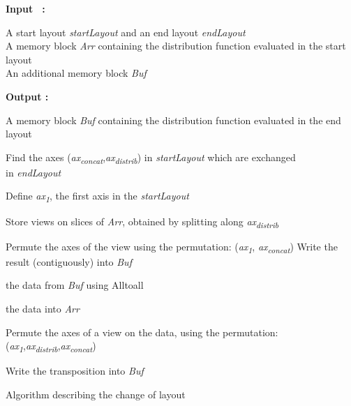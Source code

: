 \begin{algorithm}[p]
 \hspace*{\algorithmicindent} \textbf{Input \, :}
 \begin{minipage}[t]{.8\textwidth}
  A start layout {\em startLayout} and an end layout {\em endLayout} \\
  A memory block {\em Arr} containing the distribution function evaluated in the start layout \\
  An additional memory block {\em Buf} \\
 \end{minipage}
 
 \hspace*{\algorithmicindent} \textbf{Output :}
 \begin{minipage}[t]{.8\textwidth}
  A memory block {\em Buf} containing the distribution function evaluated in the end layout \\
 \end{minipage}

 \begin{algorithmic}[1]
  \STATE Find the axes ({\em ax\textsubscript{concat}},{\em ax\textsubscript{distrib}}) in {\em startLayout} which are exchanged\\ in {\em endLayout}
  
  \STATE Define {\em ax\textsubscript{1}}, the first axis in the {\em startLayout}
  
  \STATE Store views on slices of {\em Arr}, obtained by splitting along {\em ax\textsubscript{distrib}}
  
  \STATE
  
      \STATE Permute the axes of the view using the permutation: ({\em ax\textsubscript{1}}, {\em ax\textsubscript{concat}})
      \STATE Write the result (contiguously) into {\em Buf}
  \ENDFOR
  
  \STATE
  
   the data from {\em Buf} using Alltoall
  
   the data into {\em Arr}
  
  
  \STATE Permute the axes of a view on the data, using the permutation:\\ ({\em ax\textsubscript{1}},{\em ax\textsubscript{distrib}},{\em ax\textsubscript{concat}})
  
  \STATE Write the transposition into {\em Buf}
  
 \end{algorithmic}
 \caption{\label{algo::layout change} Algorithm describing the change of layout}
\end{algorithm}

